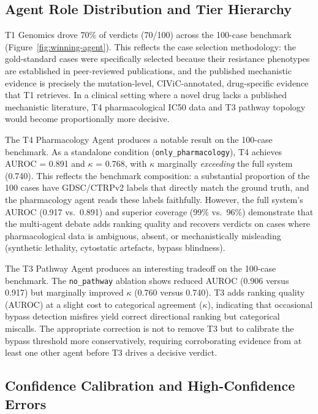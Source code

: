 \documentclass{article}
\begin{document}
\subsection{Agent Role Distribution and Tier Hierarchy}

T1 Genomics drove 70\% of verdicts (70/100) across the 100-case benchmark (Figure~\ref{fig:winning-agent}). This reflects the case selection methodology: the gold-standard cases were specifically selected because their resistance phenotypes are established in peer-reviewed publications, and the published mechanistic evidence is precisely the mutation-level, CIViC-annotated, drug-specific evidence that T1 retrieves. In a clinical setting where a novel drug lacks a published mechanistic literature, T4 pharmacological IC50 data and T3 pathway topology would become proportionally more decisive.

The T4 Pharmacology Agent produces a notable result on the 100-case benchmark. As a standalone condition (\texttt{only\_pharmacology}), T4 achieves AUROC = 0.891 and $\kappa$ = 0.768, with $\kappa$ marginally \emph{exceeding} the full system (0.740). This reflects the benchmark composition: a substantial proportion of the 100 cases have GDSC/CTRPv2 labels that directly match the ground truth, and the pharmacology agent reads these labels faithfully. However, the full system's AUROC (0.917 vs.\ 0.891) and superior coverage (99\% vs.\ 96\%) demonstrate that the multi-agent debate adds ranking quality and recovers verdicts on cases where pharmacological data is ambiguous, absent, or mechanistically misleading (synthetic lethality, cytostatic artefacts, bypass blindness).

The T3 Pathway Agent produces an interesting tradeoff on the 100-case benchmark. The \texttt{no\_pathway} ablation shows reduced AUROC (0.906 versus 0.917) but marginally improved $\kappa$ (0.760 versus 0.740). T3 adds ranking quality (AUROC) at a slight cost to categorical agreement ($\kappa$), indicating that occasional bypass detection misfires yield correct directional ranking but categorical miscalls. The appropriate correction is not to remove T3 but to calibrate the bypass threshold more conservatively, requiring corroborating evidence from at least one other agent before T3 drives a decisive verdict.

\subsection{Confidence Calibration and High-Confidence Errors}
\end{document}
